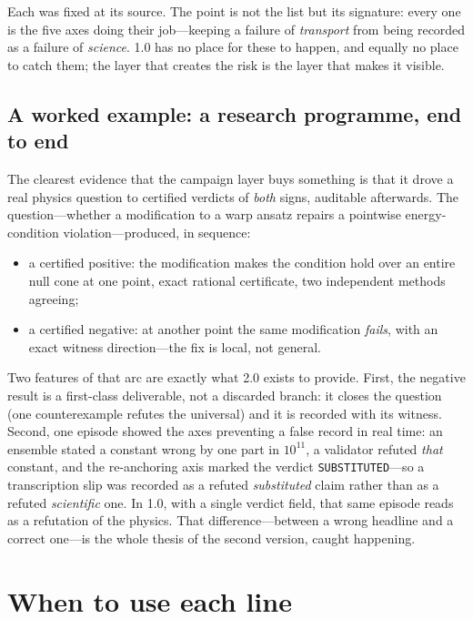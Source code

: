 \documentclass[11pt,a4paper]{article}
\newcommand{\code}[1]{\texttt{\small #1}}
\newcommand{\viol}[1]{\textcolor{astrared}{#1}}
\newcommand{\okk}[1]{\textcolor{astragreen}{#1}}
\begin{document}
\noindent Each was fixed at its source. The point is not the list but its
signature: every one is the five axes doing their job---keeping a failure of
\emph{transport} from being recorded as a failure of \emph{science}. 1.0 has no
place for these to happen, and equally no place to catch them; the layer that
creates the risk is the layer that makes it visible.

\subsection{A worked example: a research programme, end to end}

The clearest evidence that the campaign layer buys something is that it drove a
real physics question to certified verdicts of \emph{both} signs, auditable
afterwards. The question---whether a modification to a warp ansatz repairs a
pointwise energy-condition violation---produced, in sequence:

\begin{itemize}[leftmargin=1.4em, itemsep=1pt]
\item a \okk{certified positive}: the modification makes the condition hold over
      an entire null cone at one point, exact rational certificate, two
      independent methods agreeing;
\item a \viol{certified negative}: at another point the same modification
      \emph{fails}, with an exact witness direction---the fix is local, not
      general.
\end{itemize}

\noindent Two features of that arc are exactly what 2.0 exists to provide. First,
the negative result is a first-class deliverable, not a discarded branch: it
closes the question (one counterexample refutes the universal) and it is recorded
with its witness. Second, one episode showed the axes preventing a false record
in real time: an ensemble stated a constant wrong by one part in $10^{11}$, a
validator refuted \emph{that} constant, and the re-anchoring axis marked the
verdict \code{SUBSTITUTED}---so a transcription slip was recorded as a refuted
\emph{substituted} claim rather than as a refuted \emph{scientific} one. In 1.0,
with a single verdict field, that same episode reads as a refutation of the
physics. That difference---between a wrong headline and a correct one---is the
whole thesis of the second version, caught happening.

\section{When to use each line}
\end{document}
